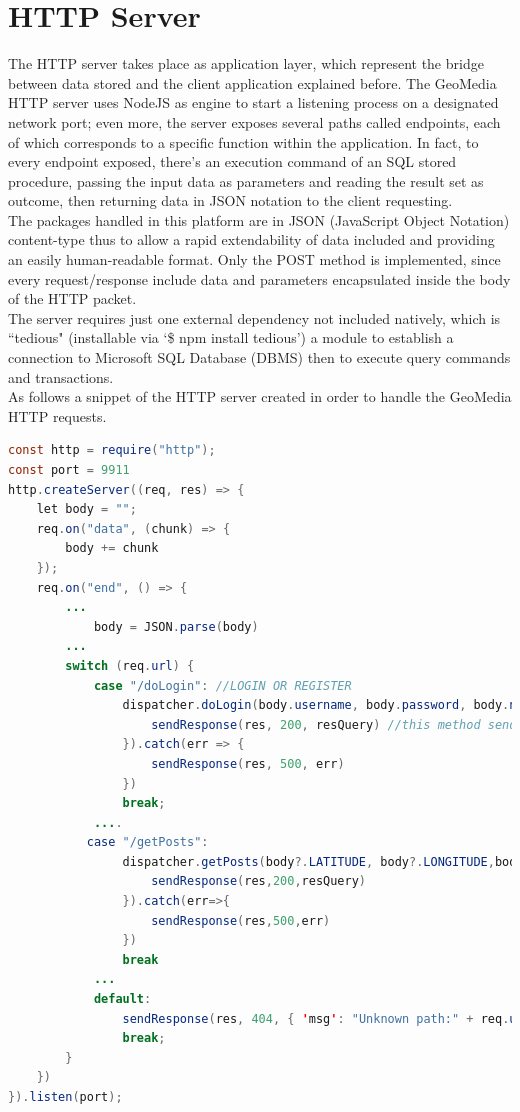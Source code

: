 \documentclass[conference]{IEEEtran}
\begin{document}
\section{HTTP Server}

The HTTP server takes place as application layer, which represent the bridge between data stored and the client application explained before.
The GeoMedia HTTP server uses NodeJS\cite{b4} as engine to start a listening process on a designated network port; even more, the server exposes several paths called endpoints, each of which corresponds to a specific function within the application. In fact, to every endpoint exposed, there's an execution command of an SQL stored procedure, passing the input data as parameters and reading the result set as outcome, then returning data in JSON notation to the client requesting.
\\
The packages handled in this platform are in JSON (JavaScript Object Notation) content-type thus to allow a rapid extendability of data included and providing an easily human-readable format.
Only the POST method is implemented, since every request/response include data and parameters encapsulated inside the body of the HTTP packet.
\\
The server requires just one external dependency not included natively, which is ``tedious"\cite{b5} (installable via `\$ npm install tedious') a module to establish a connection to Microsoft SQL Database (DBMS) then to execute query commands and transactions.
\\
As follows a snippet of the HTTP server created in order to handle the GeoMedia HTTP requests.
\begin{lstlisting}[language=Java, caption=Snippet of GeoMedia HTTP server]
const http = require("http");
const port = 9911
http.createServer((req, res) => {
    let body = "";
    req.on("data", (chunk) => {
        body += chunk
    });
    req.on("end", () => {
        ...
            body = JSON.parse(body)
        ...
        switch (req.url) {
            case "/doLogin": //LOGIN OR REGISTER
                dispatcher.doLogin(body.username, body.password, body.newuser).then(resQuery => {
                    sendResponse(res, 200, resQuery) //this method sends back the data
                }).catch(err => {
                    sendResponse(res, 500, err)
                })
                break;
            ....
           case "/getPosts":
                dispatcher.getPosts(body?.LATITUDE, body?.LONGITUDE,body?.USERNAME).then(resQuery=>{
                    sendResponse(res,200,resQuery)
                }).catch(err=>{
                    sendResponse(res,500,err)
                })
                break
            ...
            default:
                sendResponse(res, 404, { 'msg': "Unknown path:" + req.url })
                break;
        }
    })
}).listen(port);
\end{lstlisting}
\end{document}

